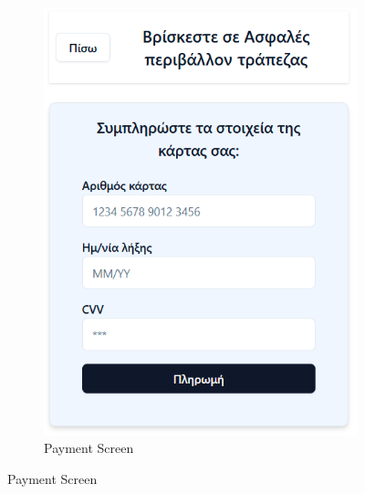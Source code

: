 \documentclass[12pt,a4paper,twoside]{book}
\begin{document}
\begin{figure}[H]
\begin{subfigure}[b]{0.48\textwidth}
        \includegraphics[width=\textwidth]{Mockup Screens/mockup-payment.png}
        \caption{Payment Screen}\label{fig:mockup6}
    \end{subfigure}
\end{figure}
\end{document}
